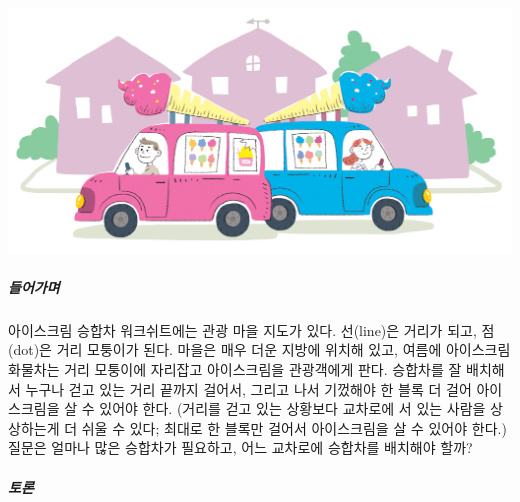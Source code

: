 \documentclass[]{article}
\begin{document}
\includegraphics{csunplugged/04-part/img/ch15-dominating-sets/14-dominating-sets-01-truck.png}

\subparagraph{들어가며}\label{section-203}

아이스크림 승합차 워크쉬트에는 관광 마을 지도가 있다. 선(line)은 거리가
되고, 점(dot)은 거리 모퉁이가 된다. 마을은 매우 더운 지방에 위치해 있고,
여름에 아이스크림 화물차는 거리 모퉁이에 자리잡고 아이스크림을
관광객에게 판다. 승합차를 잘 배치해서 누구나 걷고 있는 거리 끝까지
걸어서, 그리고 나서 기껐해야 한 블록 더 걸어 아이스크림을 살 수 있어야
한다. (거리를 걷고 있는 상황보다 교차로에 서 있는 사람을 상상하는게 더
쉬울 수 있다; 최대로 한 블록만 걸어서 아이스크림을 살 수 있어야 한다.)
질문은 얼마나 많은 승합차가 필요하고, 어느 교차로에 승합차를 배치해야
할까?

\subparagraph{토론}\label{section-204}
\end{document}
